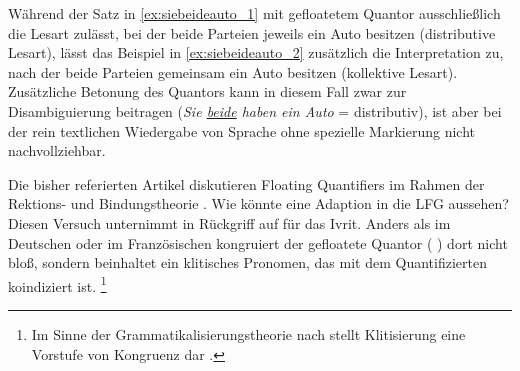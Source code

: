 Während der Satz in \cref{ex:siebeideauto_1} mit gefloatetem Quantor
ausschließlich die Lesart zulässt, bei der beide Parteien jeweils ein Auto
besitzen (distributive Lesart), lässt das Beispiel in \cref{ex:siebeideauto_2}
zusätzlich die Interpretation zu, nach der beide Parteien gemeinsam ein Auto
besitzen (kollektive Lesart). Zusätzliche Betonung des Quantors kann in diesem
Fall zwar zur Disambiguierung beitragen (\textit{Sie \ul{beide} haben ein
Auto} = distributiv), ist aber bei der rein textlichen Wiedergabe von Sprache
ohne spezielle Markierung nicht nachvollziehbar.

\label{phsec:hebrqf}
Die bisher referierten Artikel diskutieren Floating Quantifiers im Rahmen der
Rektions- und Bindungstheorie \autocite{chomsky1981}. Wie könnte eine Adaption
in die LFG aussehen? Diesen Versuch unternimmt \citet{spector2009} in Rückgriff
auf \citet{shlonsky1991} für das Ivrit. Anders als im Deutschen oder im
Französischen kongruiert der gefloatete Quantor ( ) dort
nicht bloß, sondern beinhaltet ein klitisches Pronomen, das mit dem
Quantifizierten koindiziert ist.%
%
	\footnote{Im Sinne der Grammatikalisierungs\-theorie nach \citet{lehmann2015}
		stellt Klitisierung eine Vorstufe von Kongruenz dar
		\autocite[vgl.][44]{lehmann2015}.%
	}
%

